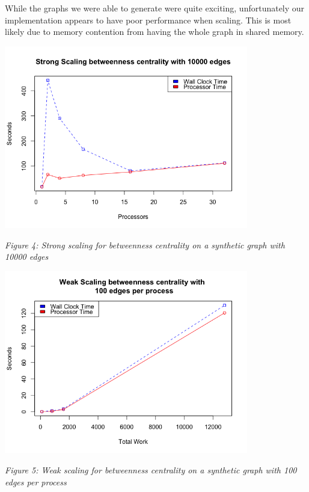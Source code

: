 \documentclass[11pt,a4paper,titlepage]{article}
\begin{document}
While the graphs we were able to generate were quite exciting, unfortunately
our implementation appears to have poor performance when scaling. This is most
likely due to memory contention from having the whole graph in shared memory.

\begin{center}
\includegraphics[width=0.8\textwidth]{figures/strong}
\end{center}
\begin{center}
\textit{Figure 4: Strong scaling for betweenness centrality on a synthetic
graph with 10000 edges}
\end{center}

\begin{center}
\includegraphics[width=0.8\textwidth]{figures/weak}
\end{center}
\begin{center}
\textit{Figure 5: Weak scaling for betweenness centrality on a synthetic graph
with 100 edges per process}
\end{center}
\end{document}
